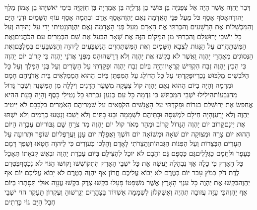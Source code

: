 \documentclass[../main/main.tex]{subfiles}
\begin{document}
\pagebreak
{}
\begin{multicols*}{\ncols}
דְּבַר יַהְוֶה אֲשֶׁר הָיָה אֶל צְפַנְיָה בֶּן כּוּשִׁי בֶן גְּדַלְיָה בֶּן אֲמַרְיָה בֶּן חִזְקִיָּה בִּימֵי יֹאשִׁיָּהוּ בֶן אָמוֹן מֶלֶךְ יְהוּדָה\PreVerseSpace{}אָסֹף אָסֵף כֹּל מֵעַל פְּנֵי הָאֲדָמָה נְאֻם יַהְוֶה\PreVerseSpace{}אָסֵף אָדָם וּבְהֵמָה אָסֵף עוֹף הַשָּׁמַיִם וּדְגֵי הַיָּם וְהַמַּכְשֵׁלוֹת אֶת הָרְשָׁעִים וְהִכְרַתִּי אֶת הָאָדָם מֵעַל פְּנֵי הָאֲדָמָה נְאֻם יַהְוֶה\PreVerseSpace{}וְנָטִיתִי יָדִי עַל יְהוּדָה וְעַל כָּל יוֹשְׁבֵי יְרוּשָׁלֵם וְהִכְרַתִּי מִן הַמָּקוֹם הַזֶּה אֶת שְׁאָר הַבַּעַל אֶת שֵׁם הַכְּמָרִים עִם הַכֹּהֲנִים\PreVerseSpace{}וְאֶת הַמִּשְׁתַּחֲוִים עַל הַגַּגּוֹת לִצְבָא הַשָּׁמָיִם וְאֶת הַמִּשְׁתַּחֲוִים הַנִּשְׁבָּעִים לַיהוָה וְהַנִּשְׁבָּעִים בְּמַלְכָּם\PreVerseSpace{}וְאֶת הַנְּסוֹגִים מֵאַחֲרֵי יַהְוֶה וַאֲשֶׁר לֹא בִקְשׁוּ אֶת יַהְוֶה וְלֹא דְרָשֻׁהוּ\PreVerseSpace{}הַס מִפְּנֵי אֲדֹנַי יַהְוֶה כִּי קָרוֹב יוֹם יַהְוֶה כִּי הֵכִין יַהְוֶה זֶבַח הִקְדִּישׁ קְרֻאָיו\PreVerseSpace{}וְהָיָה בְּיוֹם זֶבַח יַהְוֶה וּפָקַדְתִּי עַל הַשָּׂרִים וְעַל בְּנֵי הַמֶּלֶךְ וְעַל כָּל הַלֹּבְשִׁים מַלְבּוּשׁ נָכְרִי\PreVerseSpace{}וּפָקַדְתִּי עַל כָּל הַדּוֹלֵג עַל הַמִּפְתָּן בַּיּוֹם הַהוּא הַמְמַלְאִים בֵּית אֲדֹנֵיהֶם חָמָס וּמִרְמָה \ClosedSection{}וְהָיָה בַיּוֹם הַהוּא נְאֻם יַהְוֶה קוֹל צְעָקָה מִשַּׁעַר הַדָּגִים וִילָלָה מִן הַמִּשְׁנֶה וְשֶׁבֶר גָּדוֹל מֵהַגְּבָעוֹת\PreVerseSpace{}הֵילִילוּ יֹשְׁבֵי הַמַּכְתֵּשׁ כִּי נִדְמָה כָּל עַם כְּנַעַן נִכְרְתוּ כָּל נְטִילֵי כָסֶף \ClosedSection{}וְהָיָה בָּעֵת הַהִיא אֲחַפֵּשׂ אֶת יְרוּשָׁלֵם בַּנֵּרוֹת וּפָקַדְתִּי עַל הָאֲנָשִׁים הַקֹּפְאִים עַל שִׁמְרֵיהֶם הָאֹמְרִים בִּלְבָבָם לֹא יֵיטִיב יַהְוֶה וְלֹא יָרֵעַ\PreVerseSpace{}וְהָיָה חֵילָם לִמְשִׁסָּה וּבָתֵּיהֶם לִשְׁמָמָה וּבָנוּ בָתִּים וְלֹא יֵשֵׁבוּ וְנָטְעוּ כְרָמִים וְלֹא יִשְׁתּוּ אֶת יֵינָם\PreVerseSpace{}קָרוֹב יוֹם יַהְוֶה הַגָּדוֹל קָרוֹב וּמַהֵר מְאֹד קוֹל יוֹם יַהְוֶה מַר צֹרֵחַ שָׁם גִּבּוֹר\PreVerseSpace{}יוֹם עֶבְרָה הַיּוֹם הַהוּא יוֹם צָרָה וּמְצוּקָה יוֹם שֹׁאָה וּמְשׁוֹאָה יוֹם חֹשֶׁךְ וַאֲפֵלָה יוֹם עָנָן וַעֲרָפֶל\PreVerseSpace{}יוֹם שׁוֹפָר וּתְרוּעָה עַל הֶעָרִים הַבְּצֻרוֹת וְעַל הַפִּנּוֹת הַגְּבֹהוֹת\PreVerseSpace{}וַהֲצֵרֹתִי לָאָדָם וְהָלְכוּ כַּעִוְרִים כִּי לַיהוָה חָטָאוּ וְשֻׁפַּךְ דָּמָם כֶּעָפָר וּלְחֻמָם כַּגְּלָלִים\PreVerseSpace{}גַּם כַּסְפָּם גַּם זְהָבָם לֹא יוּכַל לְהַצִּילָם בְּיוֹם עֶבְרַת יַהְוֶה וּבְאֵשׁ קִנְאָתוֹ תֵּאָכֵל כָּל הָאָרֶץ כִּי כָלָה אַךְ נִבְהָלָה יַעֲשֶׂה אֵת כָּל יֹשְׁבֵי הָאָרֶץ \ClosedSection{}הִתְקוֹשְׁשׁוּ וָקוֹשּׁוּ הַגּוֹי לֹא נִכְסָף\PreVerseSpace{}בְּטֶרֶם לֶדֶת חֹק כְּמֹץ עָבַר יוֹם בְּטֶרֶם לֹא יָבוֹא עֲלֵיכֶם חֲרוֹן אַף יַהְוֶה בְּטֶרֶם לֹא יָבוֹא עֲלֵיכֶם יוֹם אַף יַהְוֶה\PreVerseSpace{}בַּקְּשׁוּ אֶת יַהְוֶה כָּל עַנְוֵי הָאָרֶץ אֲשֶׁר מִשְׁפָּטוֹ פָּעָלוּ בַּקְּשׁוּ צֶדֶק בַּקְּשׁוּ עֲנָוָה אוּלַי תִּסָּתְרוּ בְּיוֹם אַף יַהְוֶה\PreVerseSpace{}כִּי עַזָּה עֲזוּבָה תִהְיֶה וְאַשְׁקְלוֹן לִשְׁמָמָה אַשְׁדּוֹד בַּצָּהֳרַיִם יְגָרְשׁוּהָ וְעֶקְרוֹן תֵּעָקֵר \ClosedSection{}הוֹי יֹשְׁבֵי חֶבֶל הַיָּם גּוֹי כְּרֵתִים 
\end{multicols*}
\end{document}
